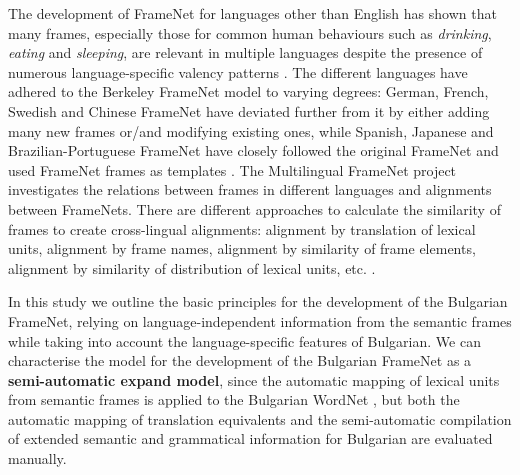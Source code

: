 \documentclass[output=paper,colorlinks,citecolor=brown]{langscibook}
\begin{document}
The development of FrameNet for languages other than English has shown that many frames, especially those for common human behaviours such as \textit{drinking}, \textit{eating} and \textit{sleeping}, are relevant in multiple languages despite the presence of numerous language-specific valency patterns \citep[78]{baker-lorenzi-2020-exploring}. The different languages have adhered to the Berkeley FrameNet model to varying degrees: German, French, Swedish and Chinese FrameNet have deviated further from it by either adding many new frames or/and modifying existing ones, while Spanish, Japanese and Brazilian-Portuguese FrameNet have closely followed the original FrameNet and used FrameNet frames as templates \citep[78]{baker-lorenzi-2020-exploring}. The Multilingual FrameNet project \citep{baker-etal-2018-frame} investigates the relations between frames in different languages and alignments between FrameNets. There are different approaches to calculate the similarity of frames to create cross-lingual alignments: alignment by translation of lexical units, alignment by frame names, alignment by similarity of frame elements, alignment by similarity of distribution of lexical units, etc. \citep[79–80]{baker-lorenzi-2020-exploring}.

In this study we outline the basic principles for the development of the Bulgarian FrameNet, relying on language-independent information from the semantic frames while taking into account the language-specific features of Bulgarian. We can characterise the model for the development of the Bulgarian FrameNet as a \textbf{semi-automatic expand model}, since the automatic mapping of lexical units from semantic frames is applied to the Bulgarian WordNet \citep{LesevaStoyanova2020}, but both the automatic mapping of translation equivalents and the semi-automatic compilation of extended semantic and grammatical information for Bulgarian are evaluated manually.
\end{document}
